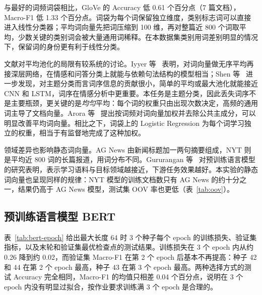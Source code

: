 \documentclass[lang=cn,a4paper]{elegantpaper}
\begin{document}
与最好的词频词袋相比，GloVe 的 Accuracy 低 0.61 个百分点（7 篇文档），Macro-F1 低 1.33 个百分点。词袋为每个词保留独立维度，类别标志词可以直接进入线性分类器；平均词向量先把词压缩到 100 维，再对整篇近 800 个词取平均，少数关键的类别词会被大量通用词稀释。在本数据集类别用词差别明显的情况下，保留词的身份更有利于线性分类。

文献对平均池化的局限有较系统的讨论。Iyyer 等~\cite{iyyer2015deep} 表明，对词向量做无序平均再接深层网络，在情感和问答分类上就能与依赖句法结构的模型相当；Shen 等~\cite{shen2018baseline} 进一步发现，对主题分类而言词序信息的贡献很小，简单的平均或最大池化就能接近 CNN 和 LSTM，词序在情感分析中更重要。本任务是主题分类，因此丢失词序不是主要瓶颈，更关键的是\emph{均匀}平均：每个词的权重只由出现次数决定，高频的通用词主导了文档向量。Arora 等~\cite{arora2017simple} 提出按词频对词向量加权并去除公共主成分，可以明显改善平均词向量。相比之下，词袋上的 Logistic Regression 为每个词学习独立的权重，相当于有监督地完成了这种加权。

领域差异也影响静态词向量。AG News 由新闻标题加一两句摘要组成，NYT 则是平均近 800 词的长篇报道，用词分布不同。Gururangan 等~\cite{gururangan2020dont} 对预训练语言模型的研究表明，表示学习语料与目标领域越接近，下游任务效果越好。本实验的静态词向量也呈现同样的规律：NYT 模型的训练文档数只有 AG News 的约十分之一，结果仍高于 AG News 模型，测试集 OOV 率也更低（表~\ref{tab:oov}）。

\subsection{预训练语言模型 BERT}
\label{sec:bert}

表~\ref{tab:bert-epoch} 给出最大长度 64 时 3 个种子每个 epoch 的训练损失、验证集指标，以及末轮和验证集最优检查点的测试结果。训练损失在 3 个 epoch 内从约 0.26 降到约 0.02，而验证集 Macro-F1 在第 2 个 epoch 后基本不再提高：种子 42 和 44 在第 2 个 epoch 最高，种子 43 在第 3 个 epoch 最高。两种选择方式的测试 Accuracy 完全相同，Macro-F1 的均值只相差 0.04 个百分点，说明在 3 个 epoch 内没有明显过拟合，按作业要求训练满 3 个 epoch 是合理的。
\end{document}

